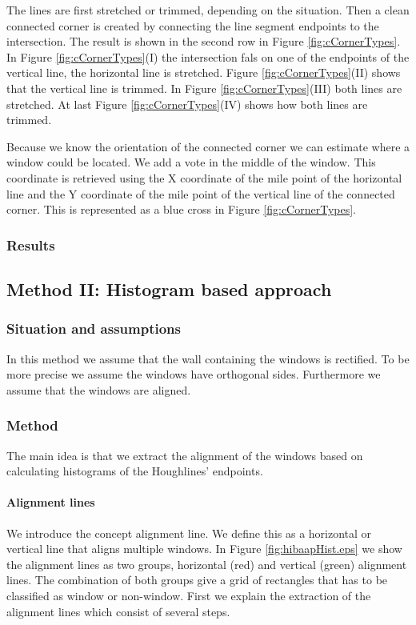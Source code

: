The lines are first stretched or
trimmed, depending on the situation. Then a clean connected corner is created by
connecting the line segment endpoints to the intersection.
The result is shown in the second row in Figure \ref{fig:cCornerTypes}.
In Figure \ref{fig:cCornerTypes}(I) the intersection fals on one of the
endpoints of the vertical line, the horizontal line is stretched.  Figure
\ref{fig:cCornerTypes}(II) shows that the vertical line is trimmed.  In Figure
\ref{fig:cCornerTypes}(III) both lines are stretched.  At last Figure
\ref{fig:cCornerTypes}(IV) shows how both lines are trimmed.


Because we know the orientation of the connected corner we can estimate where
a window could be located.  We add a vote in the middle of the window. This
coordinate is retrieved using the X coordinate of the mile point of the horizontal line
and the Y coordinate of the mile point of the vertical line of the connected corner.  
This is represented as a blue cross in Figure \ref{fig:cCornerTypes}.

\subsubsection{Results}



\subsection{Method II: Histogram based approach} 
\subsubsection{Situation and assumptions}
In this method we assume that the wall containing the windows is rectified.
To be more precise we assume the windows have orthogonal sides.
Furthermore we assume that the windows are aligned.

\subsubsection{Method}
The main idea is that we extract the alignment of the windows based on
calculating histograms of the Houghlines' endpoints.

\paragraph{Alignment lines}
We introduce the concept alignment line. We define this as a horizontal or
vertical line that aligns multiple windows. In Figure
\ref{fig:hibaapHist.eps}
we show the alignment lines as two groups, horizontal (red) and
vertical (green) alignment lines.  The combination of both groups give a grid of
rectangles that has to be classified as window or non-window.
First we explain the extraction of the alignment lines which consist of several
steps.

